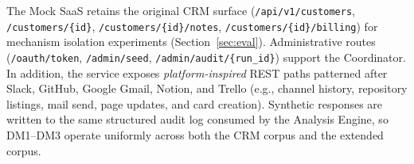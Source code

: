
The Mock SaaS retains the original CRM surface
(\texttt{/api/v1/customers}, \texttt{/customers/\{id\}},
\texttt{/customers/\{id\}/notes}, \texttt{/customers/\{id\}/billing})
for mechanism isolation experiments (Section~\ref{sec:eval}).
Administrative routes (\texttt{/oauth/token}, \texttt{/admin/seed},
\texttt{/admin/audit/\{run\_id\}}) support the Coordinator. In
addition, the service exposes \emph{platform-inspired} REST paths
patterned after Slack, GitHub, Google Gmail, Notion, and Trello (e.g.,
channel history, repository listings, mail send, page updates, and
card creation). Synthetic responses are written to the same structured
audit log consumed by the Analysis Engine, so DM1--DM3 operate
uniformly across both the CRM corpus and the extended corpus.
